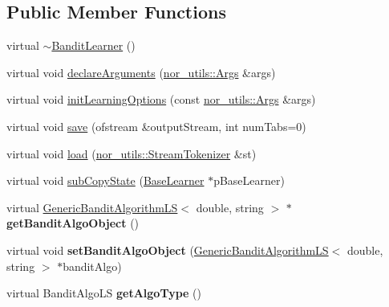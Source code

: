 \subsection*{Public Member Functions}
\begin{DoxyCompactItemize}
\item 
virtual \hyperlink{classMultiBoost_1_1BanditLearner_ad3e3007da2df56f0d05a6241e3a230ae}{$\sim$BanditLearner} ()
\item 
virtual void \hyperlink{classMultiBoost_1_1BanditLearner_a93998b6ffee55cb7255c06065387de11}{declareArguments} (\hyperlink{classnor__utils_1_1Args}{nor\_\-utils::Args} \&args)
\item 
virtual void \hyperlink{classMultiBoost_1_1BanditLearner_a0247d5ef38af725655e72abd36cd7655}{initLearningOptions} (const \hyperlink{classnor__utils_1_1Args}{nor\_\-utils::Args} \&args)
\item 
virtual void \hyperlink{classMultiBoost_1_1BanditLearner_a5cb193b8a5e621a462dc96f2c16ef610}{save} (ofstream \&outputStream, int numTabs=0)
\item 
virtual void \hyperlink{classMultiBoost_1_1BanditLearner_aaa794acb9c2bb160de2a8dc28f791141}{load} (\hyperlink{classnor__utils_1_1StreamTokenizer}{nor\_\-utils::StreamTokenizer} \&st)
\item 
virtual void \hyperlink{classMultiBoost_1_1BanditLearner_ad4edd0f5c1eee1680df304ad1df9f5e9}{subCopyState} (\hyperlink{classMultiBoost_1_1BaseLearner}{BaseLearner} $\ast$pBaseLearner)
\item 
\hypertarget{classMultiBoost_1_1BanditLearner_ada7e2bdb3c880d7acf4fb4f465fb8ec7}{
virtual \hyperlink{classMultiBoost_1_1GenericBanditAlgorithmLS}{GenericBanditAlgorithmLS}$<$ double, string $>$ $\ast$ {\bfseries getBanditAlgoObject} ()}
\label{classMultiBoost_1_1BanditLearner_ada7e2bdb3c880d7acf4fb4f465fb8ec7}

\item 
\hypertarget{classMultiBoost_1_1BanditLearner_ab5a5033fdc057d11d75f145b35df7dcd}{
virtual void {\bfseries setBanditAlgoObject} (\hyperlink{classMultiBoost_1_1GenericBanditAlgorithmLS}{GenericBanditAlgorithmLS}$<$ double, string $>$ $\ast$banditAlgo)}
\label{classMultiBoost_1_1BanditLearner_ab5a5033fdc057d11d75f145b35df7dcd}

\item 
\hypertarget{classMultiBoost_1_1BanditLearner_a89be41dae35d80a59cddda6cbe0360be}{
virtual BanditAlgoLS {\bfseries getAlgoType} ()}
\label{classMultiBoost_1_1BanditLearner_a89be41dae35d80a59cddda6cbe0360be}


\end{DoxyCompactItemize}
